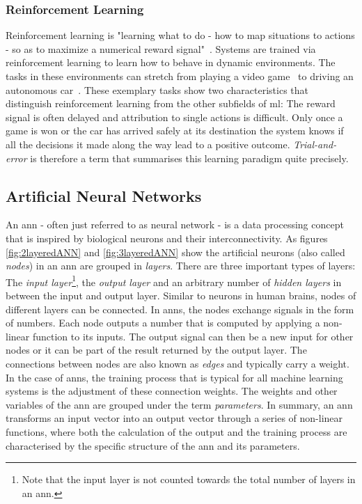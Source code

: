 \documentclass[
			   fontsize=11pt,
               paper=a4,
               bibliography=totoc,
               idxtotoc,
               headsepline,
               footsepline,
               footinclude=false,
               BCOR=12mm,
               DIV=13,
               openany,   %
               ]
               {scrbook}
\begin{document}
\subsubsection{Reinforcement Learning}

Reinforcement learning is "learning what to do - how to map situations to actions - so as to maximize a numerical reward signal"~\cite{introRL}. Systems are trained via reinforcement learning to learn how to behave in dynamic environments. The tasks in these environments can stretch from playing a video game~\cite{rlStarCraft} to driving an autonomous car~\cite{rlCars}. These exemplary tasks show two characteristics that distinguish reinforcement learning from the other subfields of \gls{ml}: The reward signal is often delayed and attribution to single actions is difficult. Only once a game is won or the car has arrived safely at its destination the system knows if all the decisions it made along the way lead to a positive outcome. \textit{Trial-and-error} is therefore a term that summarises this learning paradigm quite precisely.


\subsection{Artificial Neural Networks} \label{ssection:ann}

An \acrlong{ann} - often just referred to as neural network - is a data processing concept that is inspired by biological neurons and their interconnectivity. As figures \ref{fig:2layeredANN} and \ref{fig:3layeredANN} show the artificial neurons (also called \textit{nodes}) in an \gls{ann} are grouped in \textit{layers}. There are three important types of layers: The \textit{input layer}\footnote{Note that the input layer is not counted towards the total number of layers in an \gls{ann}.}, the \textit{output layer} and an arbitrary number of \textit{hidden layers} in between the input and output layer. Similar to neurons in human brains, nodes of different layers can be connected. In \glspl{ann}, the nodes exchange signals in the form of numbers. Each node outputs a number that is computed by applying a non-linear function to its inputs. The output signal can then be a new input for other nodes or it can be part of the result returned by the output layer. The connections between nodes are also known as \textit{edges} and typically carry a weight. In the case of \glspl{ann}, the training process that is typical for all machine learning systems is the adjustment of these connection weights. The weights and other variables of the \gls{ann} are grouped under the term \textit{parameters}. In summary, an \gls{ann} transforms an input vector into an output vector through a series of non-linear functions, where both the calculation of the output and the training process are characterised by the specific structure of the \gls{ann} and its parameters.
\end{document}
